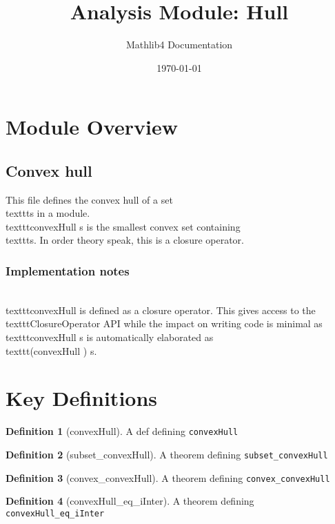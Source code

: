 \documentclass{article}
\title{Analysis Module: Hull}
\author{Mathlib4 Documentation}
\date{\today}
\theoremstyle{definition}
\newtheorem{definition}{Definition}
\begin{document}
\maketitle

\section{Module Overview}
\subsection{Convex hull}

This file defines the convex hull of a set \\texttt{s} in a module. \\texttt{convexHull  s} is the smallest convex
set containing \\texttt{s}. In order theory speak, this is a closure operator.

\subsubsection{Implementation notes}

\\texttt{convexHull} is defined as a closure operator. This gives access to the \\texttt{ClosureOperator} API
while the impact on writing code is minimal as \\texttt{convexHull  s} is automatically elaborated as
\\texttt{(convexHull ) s}.

\section{Key Definitions}
\begin{definition}[convexHull]
A def defining \texttt{convexHull}
\end{definition}

\begin{definition}[subset_convexHull]
A theorem defining \texttt{subset_convexHull}
\end{definition}

\begin{definition}[convex_convexHull]
A theorem defining \texttt{convex_convexHull}
\end{definition}

\begin{definition}[convexHull_eq_iInter]
A theorem defining \texttt{convexHull_eq_iInter}
\end{definition}
\end{document}
